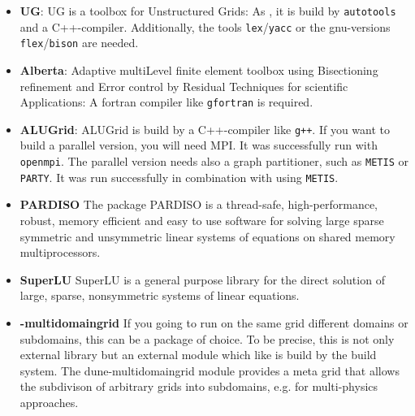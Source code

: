 \begin{itemize}
\item \textbf{UG}: UG is a toolbox for Unstructured Grids: As \Dumux, it is build by \texttt{autotools} and a C++-compiler. Additionally, the tools \texttt{lex}/\texttt{yacc} or the gnu-versions \texttt{flex}/\texttt{bison} are needed. 

\item \textbf{Alberta}: Adaptive multiLevel finite element toolbox using Bisectioning refinement and Error control by Residual Techniques for scientific Applications: A fortran compiler like \texttt{gfortran} is required.

\item \textbf{ALUGrid}: ALUGrid is build by a C++-compiler like \texttt{g++}. If you want to build a parallel version, you will need MPI. It was successfully run with \texttt{openmpi}. The parallel version needs also a graph partitioner, such as \texttt{METIS} or \texttt{PARTY}. It was run successfully in combination with \Dune using \texttt{METIS}.

\item \textbf{PARDISO} The package PARDISO is a thread-safe, high-performance, robust, memory efficient and easy to use software for solving large sparse symmetric and unsymmetric linear systems of equations on shared memory multiprocessors.

\item \textbf{SuperLU} SuperLU is a general purpose library for the direct solution of large, sparse, nonsymmetric systems of linear equations.

\item \textbf{\Dune-multidomaingrid} If you going to run on the same grid different domains or subdomains, this can be a package of choice. To be precise, this is not only external library but an external \Dune module which like \Dumux is build by the \Dune build system. The dune-multidomaingrid module provides a meta grid that allows the subdivison of arbitrary \Dune grids into subdomains, e.g. for multi-physics approaches.
\end{itemize}

